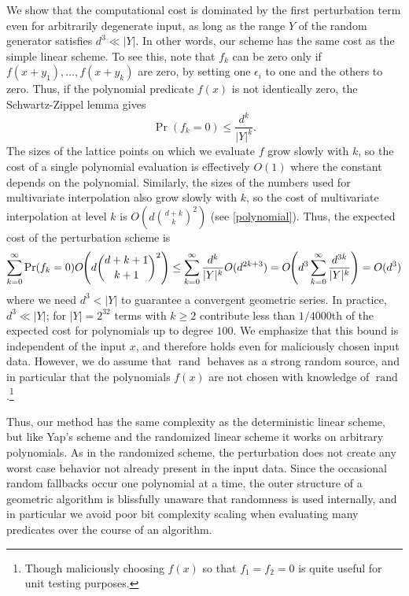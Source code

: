 \documentclass[11pt]{article}
\newcommand{\rand}{\operatorname{rand}}
\begin{document}
We show that the computational cost is dominated by the first perturbation term even for arbitrarily degenerate input, as long as the range $Y$ of the random generator
satisfies $d^3 \ll |Y|$.  In other words, our scheme has the same cost as the simple linear scheme.  To see this, note that $f_k$ can be zero only if $f(x + y_1), \ldots, f(x + y_k)$ are zero,
by setting one $\epsilon_i$ to one and the others to zero.  Thus, if the polynomial predicate $f(x)$ is not identically zero, the Schwartz-Zippel lemma gives
$$\Pr(f_k = 0) \le \frac{d^k}{|Y|^k}.$$
The sizes of the lattice points on which we evaluate $f$ grow slowly with $k$, so the cost of a single polynomial evaluation is effectively $O(1)$ where the constant depends on the
polynomial.  Similarly, the sizes of the numbers used for multivariate interpolation also grow slowly with $k$, so the cost of multivariate
interpolation at level $k$ is $O\left(d \binom{d + k}{k}^2\right)$ (see \autoref{polynomial}).  Thus, the expected cost of the perturbation scheme is
\begin{align*}
\sum_{k = 0}^\infty \Pr(f_k = 0) O\hspace{-.25em}\left(d \binom{d + k + 1}{k + 1}^2\right) \le \sum_{k = 0}^\infty \frac{d^k}{|Y|^k} O(d^{2k+3})
  = O\hspace{-.25em}\left(d^3 \sum_{k = 0}^\infty \frac{d^{3k}}{|Y|^k} \right) = O(d^3)
\end{align*}
where we need $d^3 < |Y|$ to guarantee a convergent geometric series.  In practice, $d^3 \ll |Y|$; for $|Y| = 2^{32}$ terms with $k \ge 2$ contribute less than $1/4000$th of the expected cost
for polynomials up to degree $100$.  We emphasize that this bound is independent of the input $x$, and therefore holds even for maliciously chosen input data.  However, we do
assume that $\rand$ behaves as a strong random source, and in particular that the polynomials $f(x)$ are not chosen with knowledge of $\rand$.\footnote{Though maliciously
choosing $f(x)$ so that $f_1 = f_2 = 0$ is quite useful for unit testing purposes.}

Thus, our method has the same complexity as the deterministic linear scheme, but like Yap's scheme and the randomized linear scheme it works on arbitrary polynomials.  As in the
randomized scheme, the perturbation does not create any worst case behavior not already present in the input data.  Since the occasional random fallbacks occur one
polynomial at a time, the outer structure of a geometric algorithm is blissfully unaware that randomness is used internally, and in particular we avoid poor bit complexity
scaling when evaluating many predicates over the course of an algorithm.
\end{document}
